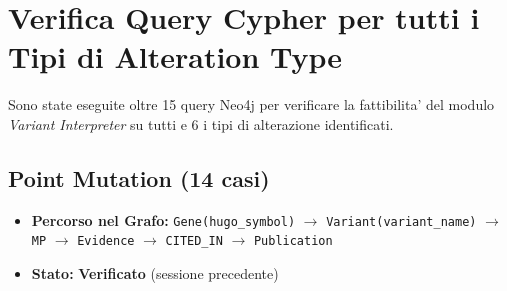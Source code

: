 \documentclass[12pt, a4paper]{article}
\newcommand{\pass}[1]{{\color{passgreen}\textbf{#1}}}
\begin{document}
\section{Verifica Query Cypher per tutti i Tipi di Alteration Type}

Sono state eseguite oltre 15 query Neo4j per verificare la fattibilita' del modulo \textit{Variant Interpreter} su tutti e 6 i tipi di alterazione identificati.

\subsection{Point Mutation (14 casi)}
\begin{itemize}[leftmargin=1.6em]
  \item \textbf{Percorso nel Grafo:} \texttt{Gene(hugo\_symbol)} $\to$ \texttt{Variant(variant\_name)} $\to$ \texttt{MP} $\to$ \texttt{Evidence} $\to$ \texttt{CITED\_IN} $\to$ \texttt{Publication}
  \item \textbf{Stato:} \pass{Verificato} (sessione precedente)
\end{itemize}
\end{document}
